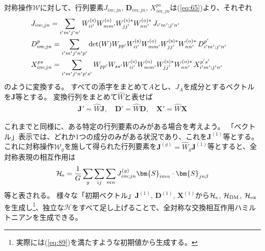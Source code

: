 \documentclass[11pt]{easymemo}
\begin{document}
対称操作$\mathcal{W}$に対して、行列要素$J_{im;jn}$, $\bm{D}_{im;jn}$, $X_{im;jn}^{ps}$は(\ref{eq:65})より、それぞれ
\begin{align}
&
J_{im;jn}=\sum_{i'm'j'n'}
W_{ii'}^{\rm (s)}W_{mm'}^{\rm (o)}W_{jj'}^{\rm (s)*}W_{nn'}^{\rm (o)*}\,J_{i'm';j'n'}
\cr&
D_{im;jn}^{p}=\sum_{i'm'j'n'p'}
{\rm det}(W)W_{pp'}W_{ii'}^{\rm (s)}W_{mm'}^{\rm (o)}W_{jj'}^{\rm (s)*}W_{nn'}^{\rm (o)*}\,D_{i'm';j'n'}^{p'}
\cr&
X_{im;jn}^{ps}=\sum_{i'm'j'n'p's'}
W_{pp'}W_{ss'}W_{ii'}^{\rm (s)}W_{mm'}^{\rm (o)}W_{jj'}^{\rm (s)*}W_{nn'}^{\rm (o)*}\,X_{i'm';j'n'}^{p's'}
\end{align}
のように変換する。
すべての添字をまとめて$A$とし、$J_{A}$を成分とするベクトルを$\bm{J}$等とする。
変換行列をまとめて$\hat{W}$と表せば
\begin{align}
\bm{J}'=\hat{W}\bm{J},
\quad
\bm{D}'=\hat{W}\bm{D},
\quad
\bm{X}'=\hat{W}\bm{X}
\end{align}

これまでと同様に、ある特定の行列要素のみがある場合を考えよう。
「ベクトル」表示では、どれか1つの成分のみがある状況であり、これを$\bm{J}^{(1)}$等とする。
これに対称操作$\mathcal{W}_{g}$を施して得られた行列要素を$\bm{J}^{(g)}=\hat{W}_{g}\bm{J}^{(1)}$等とすると、全対称表現の相互作用は
\begin{align}
\mathcal{H}_{\rm s}=\frac{1}{G}\sum_{g}\sum_{ij}\sum_{mn}J_{im;jn}^{(g)}\bm{S}_{im\alpha}\cdot\bm{S}_{jn\beta}
\end{align}
等と表される。
様々な「初期ベクトル」$\bm{J}^{(1)}$, $\bm{D}^{(1)}$, $\bm{X}^{(1)}$から$\mathcal{H}_{\rm s}$, $\mathcal{H}_{\rm DM}$, $\mathcal{H}_{\rm ex}$を生成し\footnote{実際には(\ref{eq:89})を満たすような初期値から生成する。}、独立な$\mathcal{H}$をすべて足し上げることで、全対称な交換相互作用ハミルトニアンを生成できる。
\end{document}
